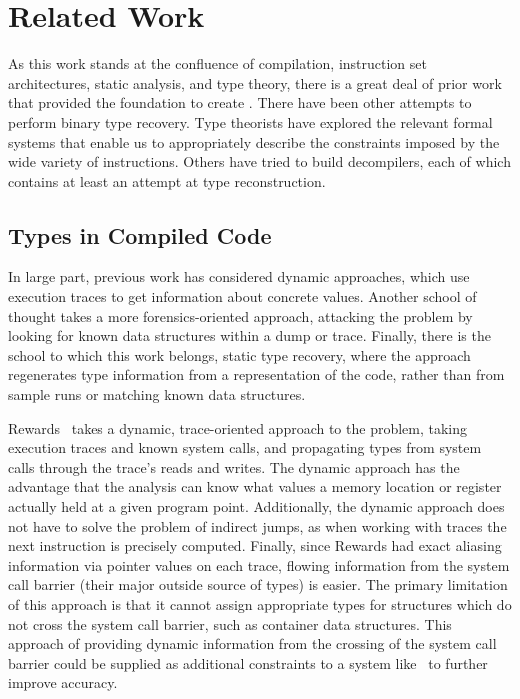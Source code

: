 \section{Related Work}
\label{sec:related}
As this work stands at the confluence of compilation, instruction set architectures, static analysis, and type theory, there is a great deal of prior work that provided the foundation to create \bitr. There have been other attempts to perform binary type recovery. Type theorists have explored the relevant formal systems that enable us to appropriately describe the constraints imposed by the wide variety of instructions. Others have tried to build decompilers, each of which contains at least an attempt at type reconstruction.
\subsection{Types in Compiled Code}
In large part, previous work has considered dynamic approaches, which use execution traces to get information about concrete values. Another school of thought takes a more forensics-oriented approach, attacking the problem by looking for known data structures within a dump or trace. Finally, there is the school to which this work belongs, static type recovery, where the approach regenerates type information from a representation of the code, rather than from sample runs or matching known data structures.

Rewards~\cite{rewards} takes a dynamic, trace-oriented approach to the problem, taking execution traces and known system calls, and propagating types from system calls through the trace's reads and writes. The dynamic approach has the advantage that the analysis can know what values a memory location or register actually held at a given program point. Additionally, the dynamic approach does not have to solve the problem of indirect jumps, as when working with traces the next instruction is precisely computed. Finally, since Rewards had exact aliasing information via pointer values on each trace, flowing information from the system call barrier (their major outside source of types) is easier.
The primary limitation of this approach is that it cannot assign appropriate types for structures which do not cross the system call barrier, such as container data structures.
This approach of providing dynamic information from the crossing of the system call barrier could be supplied as additional constraints to a system like \bitr\ to further improve accuracy.

